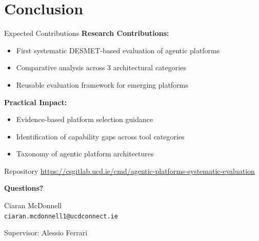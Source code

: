 \documentclass[aspectratio=169]{beamer}
\begin{document}
\section{Conclusion}

\begin{frame}{Expected Contributions}
    \textbf{Research Contributions:}
    \begin{itemize}
        \item First systematic DESMET-based evaluation of agentic platforms
        \item Comparative analysis across 3 architectural categories
        \item Reusable evaluation framework for emerging platforms
    \end{itemize}

    \vspace{0.5cm}
    \textbf{Practical Impact:}
    \begin{itemize}
        \item Evidence-based platform selection guidance
        \item Identification of capability gaps across tool categories
        \item Taxonomy of agentic platform architectures
    \end{itemize}

    \vspace{0.5cm}
    \begin{block}{Repository}
        \centering
        \url{https://csgitlab.ucd.ie/cmd/agentic-platforms-systematic-evaluation}
    \end{block}
\end{frame}

\begin{frame}
    \centering
    \Huge\textbf{Questions?}

    \vspace{1cm}
    \normalsize
    Ciaran McDonnell \\
    \texttt{ciaran.mcdonnell1@ucdconnect.ie}

    \vspace{0.5cm}
    Supervisor: Alessio Ferrari
\end{frame}
\end{document}
